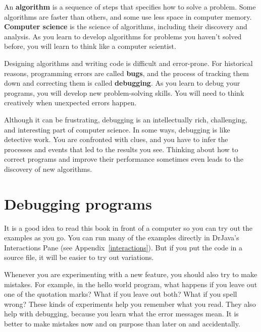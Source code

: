 
An {\bf algorithm} is a sequence of steps that specifies how to solve a problem.
Some algorithms are faster than others, and some use less space in computer memory.
{\bf Computer science} is the science of algorithms, including their discovery and analysis.
As you learn to develop algorithms for problems you haven't solved before, you will learn to think like a computer scientist.


Designing algorithms and writing code is difficult and error-prone.
For historical reasons, programming errors are called {\bf bugs}, and the process of tracking them down and correcting them is called {\bf debugging}.
As you learn to debug your programs, you will develop new problem-solving skills.
You will need to think creatively when unexpected errors happen.

Although it can be frustrating, debugging is an intellectually rich, challenging, and interesting part of computer science.
In some ways, debugging is like detective work.
You are confronted with clues, and you have to infer the processes and events that led to the results you see.
Thinking about how to correct programs and improve their performance sometimes even leads to the discovery of new algorithms.


\section{Debugging programs}
\label{sec:examples}

It is a good idea to read this book in front of a computer so you can try out the examples as you go.
You can run many of the examples directly in DrJava's Interactions Pane (see Appendix~\ref{interactions}).
But if you put the code in a source file, it will be easier to try out variations.


Whenever you are experimenting with a new feature, you should also try to make mistakes.
For example, in the hello world program, what happens if you leave out one of the quotation marks?
What if you leave out both?
What if you spell  wrong?
These kinds of experiments help you remember what you read.
They also help with debugging, because you learn what the error messages mean.
It is better to make mistakes now and on purpose than later on and accidentally.

